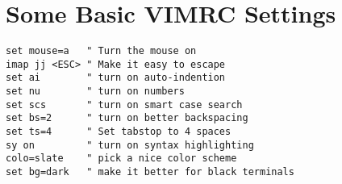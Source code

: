 \section{Some Basic VIMRC Settings}
\begin{lstlisting}[language={}, label=set code,caption=Some Code]
set mouse=a   " Turn the mouse on
imap jj <ESC> " Make it easy to escape
set ai        " turn on auto-indention
set nu        " turn on numbers
set scs       " turn on smart case search
set bs=2      " turn on better backspacing
set ts=4      " Set tabstop to 4 spaces
sy on         " turn on syntax highlighting
colo=slate    " pick a nice color scheme
set bg=dark   " make it better for black terminals
\end{lstlisting}
